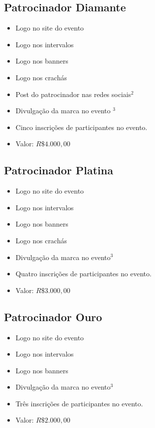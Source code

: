 \documentclass[12pt]{article}
\begin{document}
\subsection{Patrocinador Diamante}
  \begin{itemize}[label={}]
  \setlength\itemsep{0.0em}
        \item Logo no site do evento
        \item Logo nos intervalos
        \item Logo nos banners
        \item Logo nos crachás
        \item Post do patrocinador nas redes sociais$^2$
        \item Divulgação da marca no evento $^3$
        \item Cinco inscrições de participantes no evento.
        \item Valor: $R\$ 4.000,00$
  \end{itemize}
\subsection{Patrocinador Platina}
  \begin{itemize}[label={}]
  \setlength\itemsep{0.0em}
        \item Logo no site do evento
        \item Logo nos intervalos
        \item Logo nos banners
        \item Logo nos crachás
        \item Divulgação da marca no evento$^3$
        \item Quatro inscrições de participantes no evento.
        \item Valor: $R\$ 3.000,00$
  \end{itemize}
\subsection{Patrocinador Ouro}
  \begin{itemize}[label={}]
  \setlength\itemsep{0.0em}
        \item Logo no site do evento
        \item Logo nos intervalos
        \item Logo nos banners
        \item Divulgação da marca no evento$^3$
        \item Três inscrições de participantes no evento.
        \item Valor: $R\$ 2.000,00$
  \end{itemize}
\end{document}

